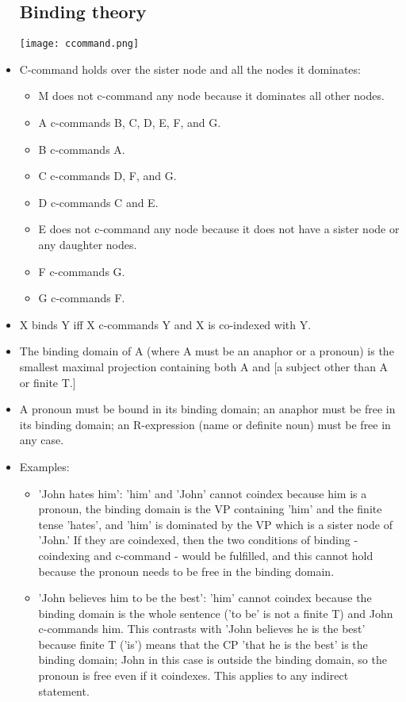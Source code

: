 \documentclass{article}
\begin{document}
\begin{itemize}
  \subsection{Binding theory}
  \texttt{[image: ccommand.png]}
  \item C-command holds over the sister node and all the nodes it dominates:
  \begin{itemize}
    \item M does not c-command any node because it dominates all other nodes.
    \item A c-commands B, C, D, E, F, and G.
    \item B c-commands A.
    \item C c-commands D, F, and G.
    \item D c-commands C and E.
    \item E does not c-command any node because it does not have a sister node or any daughter nodes.
    \item F c-commands G.
    \item G c-commands F.
    \end{itemize}
    \item X binds Y iff X c-commands Y and X is co-indexed with Y.
    \item The binding domain of A (where A must be an anaphor or a pronoun) is the smallest maximal projection containing both A and [a subject other than A or finite T.]
    \item A pronoun must be bound in its binding domain; an anaphor must be free in its binding domain; an R-expression (name or definite noun) must be free in any case.
    \item Examples:
    \begin{itemize}
        \item 'John hates him': 'him' and 'John' cannot coindex because him is a pronoun, the binding domain is the VP containing 'him' and the finite tense 'hates', and 'him' is dominated by the VP which is a sister node of 'John.' If they are coindexed, then the two conditions of binding - coindexing and c-command - would be fulfilled, and this cannot hold because the pronoun needs to be free in the binding domain.
        \item 'John believes him to be the best': 'him' cannot coindex because the binding domain is the whole sentence ('to be' is not a finite T) and John c-commands him. This contrasts with 'John believes he is the best' because finite T ('is') means that the CP 'that he is the best' is the binding domain; John in this case is outside the binding domain, so the pronoun is free even if it coindexes. This applies to any indirect statement.

\end{itemize}
\end{itemize}
\end{document}
